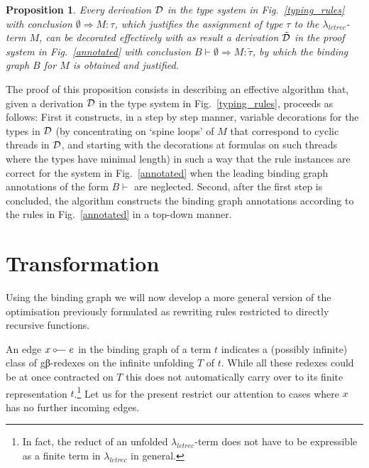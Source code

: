 \documentclass[submission,copyright,creativecommons]{eptcs}
\newtheorem{proposition}[theorem]{Proposition}
\newcommand{\lambdaletrec}{\ensuremath{\lambda_\textit{letrec}}}
\newcommand{\alter}{M}
\newcommand\binds{\mathrel{\scriptsize\fourier\hspace{-0.3em}}}
\newcommand{\nbde}{\nobreakdash-\hspace*{0pt}}
\renewcommand\;{\,}
\newcommand\T{\ensuremath{\vdash}}
\newcommand{\aDeriv}{{\cal D}}
\newcommand{\aDerivtilde}{\tilde{\aDeriv}}
\begin{document}
\begin{proposition}
Every derivation $\aDeriv$ in the type system in Fig.~\ref{typing_rules}
  with conclusion $\emptyset \Rightarrow \alter : \tau $,
  which justifies the assignment of type $\tau$ to the $\lambdaletrec$\nbde{}term $\alter$,
  can be decorated effectively with as result
  a derivation $\aDerivtilde$ in the proof system in Fig.~\ref{annotated}
  with conclusion $ B \T \emptyset \Rightarrow \alter : \tilde{\tau} $,
  by which the binding graph $B$ for $\alter$ is obtained and justified.  
\end{proposition}

The proof of this proposition consists in describing an effective algorithm
that, given a derivation $\aDeriv$ in the type system in Fig.~\ref{typing_rules}, proceeds as follows:
First it constructs, in a step by step manner, variable decorations for the types in $\aDeriv$ 
(by concentrating on `spine loops' of $\alter$ that correspond to cyclic threads in $\aDeriv$,
and starting with the decorations at formulas on such threads where the types have minimal length)
in such a way that the rule instances are correct for the system in Fig.~\ref{annotated}
when the leading binding graph annotations of the form $B \T$ are neglected.
Second, after the first step is concluded, the algorithm constructs 
the binding graph annotations according to the rules in Fig.~\ref{annotated}
in a top-down manner.
 


\section{Transformation}
Using the binding graph we will now develop a more general version of the
optimisation previously formulated as rewriting rules restricted to directly
recursive functions.

An edge $x \binds e$ in the binding graph of a term $t$ indicates a (possibly
infinite) class of gβ-redexes on the infinite unfolding $T$ of $t$. While all
these redexes could be at once contracted on $T$ this does not automatically
carry over to its finite representation $t$.\footnote{In fact, the reduct of an
unfolded $\lambdaletrec$-term does not have to be expressible as a finite term
in $\lambdaletrec$ in general.} Let us for the present restrict our attention
to cases where $x$ has no further incoming edges.
\end{document}
